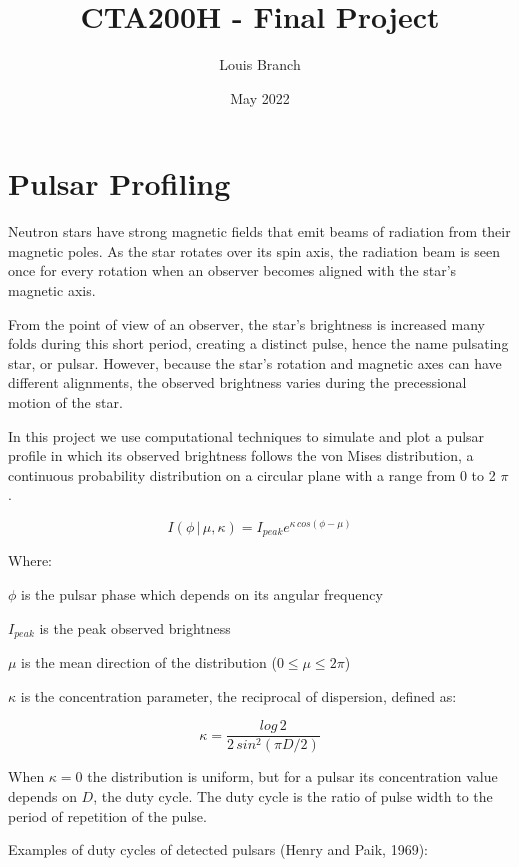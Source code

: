 \documentclass{article}
\title{CTA200H - Final Project}
\author{Louis Branch}
\date{May 2022}
\begin{document}
\maketitle

\section{Pulsar Profiling}

Neutron stars have strong magnetic fields that emit beams of radiation from 
their magnetic poles. As the star rotates over its spin axis, the radiation beam
is seen once for every rotation when an observer becomes aligned with the 
star's magnetic axis.

From the point of view of an observer, the star's brightness is increased many
folds during this short period, creating a distinct pulse, hence the name
pulsating star, or pulsar. However, because the star's rotation and magnetic
axes can have different alignments, the observed brightness varies during the
precessional motion of the star.

In this project we use computational techniques to simulate and plot a pulsar
profile in which its observed brightness follows the von Mises distribution,
a continuous probability distribution on a circular plane with a range from 0
to 2 $\pi$.

\begin{equation}
I(\phi \, | \, \mu,\kappa) = I_{peak}e^{\kappa\, cos(\phi-\mu)}
\end{equation}

Where:

$\phi$ is the pulsar phase which depends on its angular frequency

$I_{peak}$ is the peak observed brightness

$\mu$ is the mean direction of the distribution ($0 \leq \mu \leq 2 \pi$)

$\kappa$ is the concentration parameter, the reciprocal of dispersion,
defined as:

\begin{equation}
\kappa = \frac{log \, 2}{2\, sin^2(\pi D/2)}
\end{equation}

When $\kappa = 0$ the distribution is uniform, but for a pulsar its
concentration value depends on $D$, the duty cycle. The duty cycle is the ratio
of pulse width to the period of repetition of the pulse.

Examples of duty cycles of detected pulsars (Henry and Paik, 1969):
\end{document}
